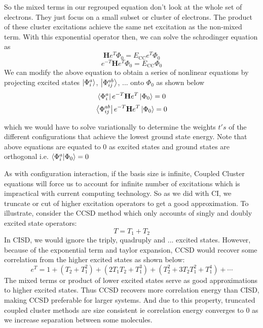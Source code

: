 \documentclass{article}
\begin{document}
      So the mixed terms in our regrouped equation don't look at the whole
      set of electrons. They just focus on a small subset or cluster of
      electrons. The product of these cluster excitations achieve the same
      net excitation as the non-mixed term. With this exponential operator
      then, we can solve the schrodinger equation as
      \[\mathbf{H}e^{T}\Phi_0 = E_{\text{CC}}e^{T}\Phi_0\]
      \[e^{-T}\mathbf{H}e^{T}\Phi_0 =E_{\text{CC}}\Phi_0 \]
      We can modify the above equation to obtain a series of nonlinear equations
      by projecting excited states \(\ket{\Phi_{i}^{a}} \),
      \(\ket{\Phi_{ij}^{ab}}\), ... onto \(\Phi_0\) as shown below
      \[\bra{\Phi_{i}^{a}}e^{-T}\mathbf{H}e^{T}\ket{\Phi_0} = 0\]
      \[\bra{\Phi_{ij}^{ab}}e^{-T}\mathbf{H}e^{T}\ket{\Phi_0} = 0\]

      which we would have to solve variationally to determine the weights
      \(t's\) of the different configurations that achieve the lowest ground
      state energy. Note that above equations are equated to 0 as excited
      states and ground states are orthogonal i.e.
      \(\bra{\Phi_{i}^{a}}\ket{\Phi_0} = 0\)


      As with configuration interaction, if the basis size is infinite, Coupled
      Cluster equations will force us to account for infinite number of excitations
      which is impractical with current computing technology. So as we did with
      CI, we truncate or cut of higher excitation operators to get a good
      approximation. To illustrate, consider the CCSD method which only
      accounts of singly and doubly excited state operators:
      \[ T = T_1 + T_2\]
      In CISD, we would ignore the triply, quadruply and ...
      excited states. However, because of the exponential term and taylor
      expansion, CCSD would recover some correlation from the higher excited
      states as shown below:
      \[e^T = 1 + (T_2 + T_1^2) + (2T_1T_2 + T_1^3) +
      (T_2^2 + 3T_2T_1^2 + T_1^4) + \cdots \]
      The mixed terms or product of lower excited states serve as good
      approximations to higher excited states. Thus CCSD recovers more correlation
      energy than CISD, making CCSD preferable for larger systems. And due to
      this property, truncated coupled cluster methods are size consistent ie
      correlation energy converges to 0 as we increase separation between
      some molecules.
\end{document}

